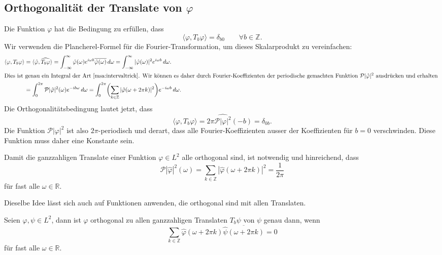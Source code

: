 %
%
\subsection{Orthogonalität der Translate von $\varphi$}
Die Funktion $\varphi$ hat die Bedingung zu erfüllen, dass
\[
\langle \varphi, T_b\varphi\rangle = \delta_{b0}
\qquad\forall b\in\mathbb Z.
\]
Wir verwenden die Plancherel-Formel für die Fourier-Transformation,
um dieses Skalarprodukt zu vereinfachen:
\begin{align*}
\langle \varphi,T_b\varphi\rangle
&=
\langle \hat{\varphi},\widehat{T_b\varphi}\rangle
=
\int_{-\infty}^\infty
\hat{\varphi}(\omega) e^{i\omega b}\overline{\hat{\varphi}(\omega)}
\,d\omega
=
\int_{-\infty}^\infty
|\hat{\varphi}(\omega)|^2 e^{i\omega b}
\,d\omega.
\\
\intertext{Dies ist genau ein Integral der Art~\eqref{msa:intervaltrick}.
Wir können es daher durch Fourier-Koeffizienten der periodische 
gemachten Funktion $\mathcal{P}|\hat{\varphi}|^2$ ausdrücken und
erhalten
}
&=
\int_0^{2\pi}
\mathcal{P}|\hat{\varphi}|^2(\omega) e^{-ib\omega}
\,d\omega
=
\int_0^{2\pi}
\biggl(
\sum_{k\in\mathbb Z}
|\hat{\varphi}(\omega + 2\pi k)|^2\biggr)
e^{-i\omega b}
\,d\omega.
\end{align*}
Die Orthogonalitätsbedingung lautet jetzt, dass 
\[
\langle \varphi,T_b\varphi\rangle
=
2\pi
\widehat{\mathcal{P}|\varphi|^2}(-b)
=
\delta_{0b}.
\]
Die Funktion $\mathcal{P}|\varphi|^2$ ist also $2\pi$-periodisch und
derart, dass alle Fourier-Koeffizienten ausser der Koeffizienten für
$b=0$ verschwinden.
Diese Funktion muss daher eine Konstante sein.

\begin{satz}
\label{satz:msa:orthogonalitaetsbedingung}
Damit die ganzzahligen Translate einer Funktion $\varphi\in L^2$ alle
orthogonal sind, ist notwendig und hinreichend, dass 
\begin{equation}
\mathcal{P}|\hat{\varphi}|^2(\omega)
=
\sum_{k\in\mathbb Z} |\hat{\varphi}(\omega + 2\pi k)|^2
=
\frac1{2\pi}
\label{msa:orthogonalitaetsbedingung}
\end{equation}
für fast alle $\omega\in\mathbb R$.
\end{satz}

Dieselbe Idee lässt sich auch auf Funktionen anwenden, die orthogonal
sind mit allen Translaten.

\begin{satz}
\label{satz:msa:alleorthogonal}
Seien $\varphi,\psi\in L^2$, dann ist $\varphi$ orthogonal zu allen
ganzzahligen Translaten $T_b\psi$  von $\psi$ genau dann, wenn
\begin{equation}
\sum_{k\in\mathbb Z} \hat{\varphi}(\omega+2\pi k)\overline{\hat{\psi}(\omega+2\pi k)}
=
0
\end{equation}
für fast alle $\omega\in\mathbb R$.
\end{satz}

